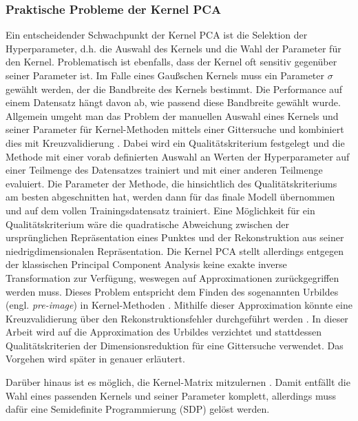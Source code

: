 \subsubsection{Praktische Probleme der Kernel PCA}
\label{ch:MethodenDerDimRed:statistisch:kPCA:AuswahlKF}

Ein entscheidender Schwachpunkt der Kernel PCA ist die Selektion der Hyperparameter, d.h. die
Auswahl des Kernels und die Wahl der Parameter für den Kernel. Problematisch ist ebenfalls, dass
der Kernel oft sensitiv gegenüber seiner Parameter ist. Im Falle eines Gaußschen Kernels muss ein
Parameter $\sigma$ gewählt werden, der die Bandbreite des Kernels bestimmt. Die Performance auf
einem Datensatz hängt davon ab, wie passend diese Bandbreite gewählt wurde. Allgemein umgeht man
das Problem der manuellen Auswahl eines Kernels und seiner Parameter für Kernel-Methoden mittels
einer Gittersuche und kombiniert dies mit Kreuzvalidierung \parencite[1]{Alam.2014}. Dabei wird ein Qualitätskriterium festgelegt und die Methode mit einer vorab
definierten Auswahl an Werten der Hyperparameter auf einer Teilmenge des Datensatzes trainiert und
mit einer anderen Teilmenge evaluiert. Die Parameter der Methode, die hinsichtlich des
Qualitätskriteriums am besten abgeschnitten hat, werden dann für das finale Modell übernommen und
auf dem vollen Trainingsdatensatz trainiert. Eine Möglichkeit für ein Qualitätskriterium wäre die
quadratische Abweichung zwischen der ursprünglichen Repräsentation eines Punktes und der
Rekonstruktion aus seiner niedrigdimensionalen Repräsentation. Die Kernel PCA stellt allerdings
entgegen der klassischen Principal Component Analysis keine exakte inverse Transformation zur
Verfügung, weswegen auf Approximationen zurückgegriffen werden muss. Dieses Problem entspricht dem
Finden des sogenannten Urbildes (engl. \textit{pre-image}) in Kernel-Methoden \parencite{Kwok.2004}. Mithilfe dieser Approximation könnte eine Kreuzvalidierung über den
Rekonstruktionsfehler durchgeführt werden \parencite[siehe z.B.][]{Alam.2014}. In dieser Arbeit wird auf die Approximation des Urbildes
verzichtet und stattdessen Qualitätskriterien der Dimensionsreduktion für eine Gittersuche
verwendet. Das Vorgehen wird später in 
genauer erläutert.

Darüber hinaus ist es möglich, die Kernel-Matrix mitzulernen \parencite[siehe z.B.][]{Weinberger.2004b}. Damit entfällt die Wahl eines passenden Kernels und seiner
Parameter komplett, allerdings muss dafür eine Semidefinite Programmierung (SDP) gelöst werden.

